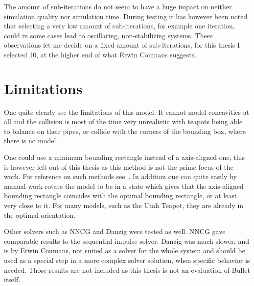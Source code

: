 The amount of sub-iterations do not seem to have a huge impact on neither simulation
quality nor simulation time.
During testing it has however been noted that selecting a very low amount of
sub-iterations, for example one iteration, could in some cases lead to oscillating,
 non-stabilizing systems. These observations let me decide on a fixed amount of sub-iterations, for
this thesis I selected 10, at the higher end of what Erwin Coumans suggests.

\section{Limitations}
One quite clearly see the limitations of this model. It cannot model concavities
at all and the collision is most of the time very unrealistic with teapots being
able to balance on their pipes, or collide with the corners of the bounding box,
where there is no model.

One could use a minimum bounding rectangle instead of a
axis-aligned one, this is however left out of this thesis as this method is not
the prime focus of the work. For reference on such methods see~\cite{minBounding}.
In addition one can quite easily by manual work rotate the model to be in a state
 which gives that the axis-aligned bounding
rectangle coincides with the optimal bounding rectangle, or at least very close
to it. For many models, such as the Utah Teapot, they are already in the optimal
orientation.

Other solvers such as NNCG and Danzig were tested as well. NNCG gave comparable
results to the sequential impulse solver. Danzig was much slower, and is by
Erwin Coumans, not suited as a solver for the whole system and should be used as
a special step in a more complex solver solution, when specific behavior is needed.
Those results are not included as this thesis is not an evaluation of Bullet itself.
